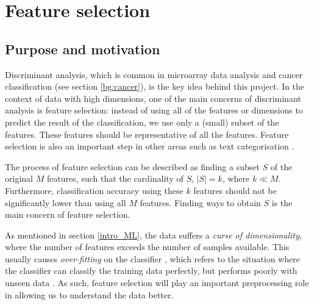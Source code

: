 \documentclass[12pt, twoside, a4paper]{report}
\begin{document}
\section{Feature selection} \label{bg:feature_selection}

\subsection{Purpose and motivation} \label{bg:fs:purpose}

Discriminant analysis, which is common in microarray data analysis and cancer classification (see section \ref{bg:cancer}), is the key idea behind this project. In the context of data with high dimensions, one of the main concerns of discriminant analysis is feature selection: instead of using all of the features or dimensions to predict the result of the classification, we use only a (small) subset of the features. These features should be representative of all the features. Feature selection is also an important step in other areas such as text categorisation \cite{RefWorks:197}.

The process of feature selection can be described as finding a subset $S$ of the original $M$ features, such that the cardinality of $S$, $|S|=k$, where $k \ll M$. Furthermore, classification accuracy using these $k$ features should not be significantly lower than using all $M$ features. Finding ways to obtain $S$ is the main concern of feature selection.

As mentioned in section \ref{intro_ML}, the data suffers a \textit{curse of dimensionality}, where the number of features exceeds the number of samples available. This usually causes \textit{over-fitting} on the classifier \cite{RefWorks:115, RefWorks:175}, which refers to the situation where the classifier can classify the training data perfectly, but performs poorly with unseen data \cite{RefWorks:98}. As such, feature selection will play an important preprocessing role in allowing us to understand the data better.
\end{document}
